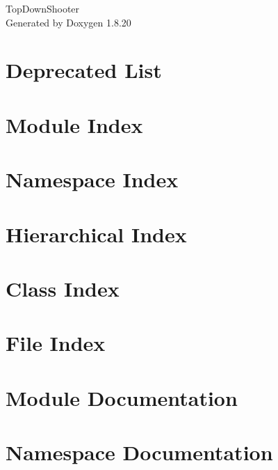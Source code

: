 \let\mypdfximage\pdfximage\def\pdfximage{\immediate\mypdfximage}\documentclass[twoside]{book}
\newcommand{\+}{\discretionary{\mbox{\scriptsize$\hookleftarrow$}}{}{}}
\newcommand{\clearemptydoublepage}{%
  \newpage{\pagestyle{empty}\cleardoublepage}%
}
\begin{document}
\hypersetup{pageanchor=false,
             bookmarksnumbered=true,
             pdfencoding=unicode
            }
\begin{titlepage}
\vspace*{7cm}
\begin{center}%
{\Large Top\+Down\+Shooter }\\
\vspace*{1cm}
{\large Generated by Doxygen 1.8.20}\\
\end{center}
\end{titlepage}
\clearemptydoublepage
{}
\tableofcontents
\clearemptydoublepage
{}
\hypersetup{pageanchor=true}

\chapter{Deprecated List}
\label{deprecated}

\chapter{Module Index}

\chapter{Namespace Index}

\chapter{Hierarchical Index}

\chapter{Class Index}

\chapter{File Index}

\chapter{Module Documentation}





\chapter{Namespace Documentation}






\end{document}
